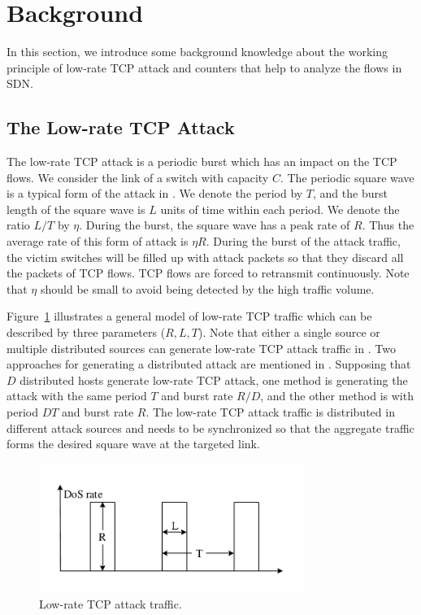 \documentclass[conference]{IEEEtran}
\begin{document}
\section{Background}
In this section, we introduce some background knowledge about the working principle of low-rate TCP attack and counters that help to analyze the flows in SDN.

\subsection{The Low-rate TCP Attack}
The low-rate TCP attack is a periodic burst which has an impact on the TCP flows. We consider the link of a switch with capacity $C$. The periodic square wave is a typical form of the attack in \cite{b20}. We denote the period by $T$, and the burst length of the square wave is $L$ units of time within each period. We denote the ratio $L / T$ by $\eta$. During the burst, the square wave has a peak rate of $R$. Thus the average rate of this form of attack is $\eta R$. During the burst of the attack traffic, the victim switches will be filled up with attack packets so that they discard all the packets of TCP flows. TCP flows are forced to retransmit continuously. Note that $\eta$ should be small to avoid being detected by the high traffic volume.

Figure~\ref{fig:LDoS} illustrates a general model of low-rate TCP traffic which can be described by three parameters ($R, L, T$). Note that either a single source or multiple distributed sources can generate low-rate TCP attack traffic in \cite{b4}. Two approaches for generating a distributed attack are mentioned in \cite{b3}. Supposing that $D$ distributed hosts generate low-rate TCP attack, one method is generating the attack with the same period $T$ and burst rate $R/D$, and the other method is with period $DT$ and burst rate $R$. The low-rate TCP attack traffic is distributed in different attack sources and needs to be synchronized so that the aggregate traffic forms the desired square wave at the targeted link. 

\begin{figure}
\vspace{-0.2in}
\centering
\includegraphics[width=3.4in]{Design/LDoS.pdf}
\vspace{-0.1in}
\caption{\small{Low-rate TCP attack traffic.}}
\label{fig:LDoS}
\vspace{-0.2in}
\end{figure}
\end{document}

